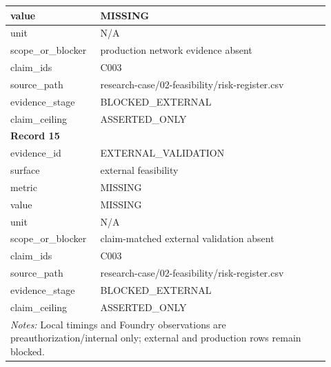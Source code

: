 \begin{longtable}{|p{0.24\linewidth}|p{0.68\linewidth}|}
value & MISSING \\ \hline
unit & N/A \\ \hline
scope\_\allowbreak{}or\_\allowbreak{}blocker & production network evidence absent \\ \hline
claim\_\allowbreak{}ids & C003 \\ \hline
source\_\allowbreak{}path & research-case/02-feasibility/risk-register.csv \\ \hline
evidence\_\allowbreak{}stage & BLOCKED\_\allowbreak{}EXTERNAL \\ \hline
claim\_\allowbreak{}ceiling & ASSERTED\_\allowbreak{}ONLY \\ \hline
\multicolumn{2}{|l|}{\textbf{Record 15}} \\ \hline
evidence\_\allowbreak{}id & EXTERNAL\_\allowbreak{}VALIDATION \\ \hline
surface & external feasibility \\ \hline
metric & MISSING \\ \hline
value & MISSING \\ \hline
unit & N/A \\ \hline
scope\_\allowbreak{}or\_\allowbreak{}blocker & claim-matched external validation absent \\ \hline
claim\_\allowbreak{}ids & C003 \\ \hline
source\_\allowbreak{}path & research-case/02-feasibility/risk-register.csv \\ \hline
evidence\_\allowbreak{}stage & BLOCKED\_\allowbreak{}EXTERNAL \\ \hline
claim\_\allowbreak{}ceiling & ASSERTED\_\allowbreak{}ONLY \\ \hline
\multicolumn{2}{|p{0.92\linewidth}|}{\textit{Notes:} Local timings and Foundry observations are preauthorization/internal only; external and production rows remain blocked.} \\ \hline
\end{longtable}
\endgroup

